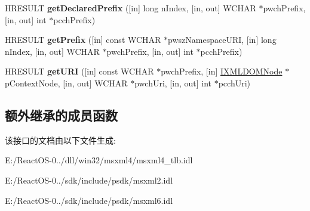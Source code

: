 \begin{DoxyCompactItemize}
H\+R\+E\+S\+U\+LT {\bfseries get\+Declared\+Prefix} (\mbox{[}in\mbox{]} long n\+Index, \mbox{[}in, out\mbox{]} W\+C\+H\+AR $\ast$pwch\+Prefix, \mbox{[}in, out\mbox{]} int $\ast$pcch\+Prefix)
\item 
\mbox{\label{interface_m_s_x_m_l2_1_1_i_m_x_namespace_manager_a7c2985178d6e7a2aba6dda34e37c82a5}} 
H\+R\+E\+S\+U\+LT {\bfseries get\+Prefix} (\mbox{[}in\mbox{]} const W\+C\+H\+AR $\ast$pwsz\+Namespace\+U\+RI, \mbox{[}in\mbox{]} long n\+Index, \mbox{[}in, out\mbox{]} W\+C\+H\+AR $\ast$pwch\+Prefix, \mbox{[}in, out\mbox{]} int $\ast$pcch\+Prefix)
\item 
\mbox{\label{interface_m_s_x_m_l2_1_1_i_m_x_namespace_manager_aa67b5c1118099d7eb5de2dce313bb46c}} 
H\+R\+E\+S\+U\+LT {\bfseries get\+U\+RI} (\mbox{[}in\mbox{]} const W\+C\+H\+AR $\ast$pwch\+Prefix, \mbox{[}in\mbox{]} \hyperlink{interface_m_s_x_m_l2_1_1_i_x_m_l_d_o_m_node}{I\+X\+M\+L\+D\+O\+M\+Node} $\ast$p\+Context\+Node, \mbox{[}in, out\mbox{]} W\+C\+H\+AR $\ast$pwch\+Uri, \mbox{[}in, out\mbox{]} int $\ast$pcch\+Uri)
\end{DoxyCompactItemize}
\subsection*{额外继承的成员函数}


该接口的文档由以下文件生成\+:\begin{DoxyCompactItemize}
\item 
E\+:/\+React\+O\+S-\/0../dll/win32/msxml4/msxml4\+\_\+tlb.\+idl\item 
E\+:/\+React\+O\+S-\/0../sdk/include/psdk/msxml2.\+idl\item 
E\+:/\+React\+O\+S-\/0../sdk/include/psdk/msxml6.\+idl\end{DoxyCompactItemize}
